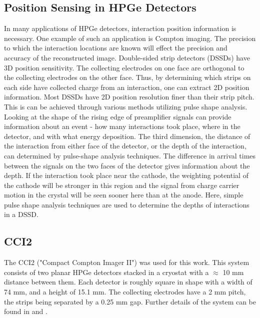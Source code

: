 \subsection*{Position Sensing in HPGe Detectors}

In many applications of HPGe detectors, interaction position information is necessary. One example of such an application is Compton imaging. The precision to which the interaction locations are known will effect the precision and accuracy of the reconstructed image.
Double-sided strip detectors (DSSDs) have 3D position sensitivity. The collecting electrodes on one face are orthogonal to the collecting electrodes on the other face. Thus, by determining which strips on each side have collected charge from an interaction, one can extract 2D position information. Most DSSDs have 2D position resolution finer than their strip pitch. This is can be achieved through various methods utilizing pulse shape analysis. Looking at the shape of the rising edge of preamplifier signals can provide information about an event - how many interactions took place, where in the detector, and with what energy deposition. 
The third dimension, the distance of the interaction from either face of the detector, or the depth of the interaction, can determined by pulse-shape analysis techniques. The difference in arrival times between the signals on the two faces of the detector gives information about the depth. If the interaction took place near the cathode, the weighting potential of the cathode will be stronger in this region and the signal from charge carrier motion in the crystal will be seen sooner here than at the anode. Here, simple pulse shape analysis techniques are used to determine the depths of interactions in a DSSD.

\subsection*{CCI2}

The CCI2 ("Compact Compton Imager II") was used for this work. This system consists of two planar HPGe detectors stacked in a cryostat with a $\approx$ 10 mm distance between them. Each detector is roughly square in shape with a width of 74 mm, and a height of 15.1 mm. The collecting electrodes have a 2 mm pitch, the strips being separated by a 0.25 mm gap. Further details of the system can be found in \cite{cci21} and \cite{cci22}.